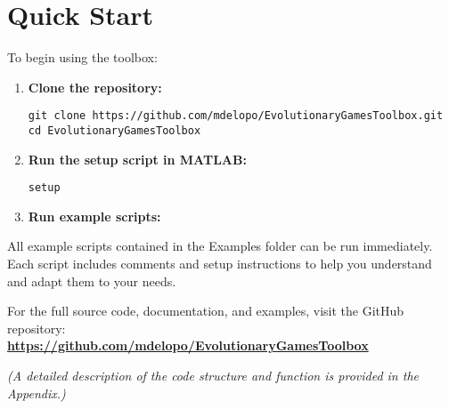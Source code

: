 \section{Quick Start}
To begin using the toolbox:
\begin{enumerate}
	\item \textbf{Clone the repository:}
	\begin{verbatim}
git clone https://github.com/mdelopo/EvolutionaryGamesToolbox.git
cd EvolutionaryGamesToolbox
	\end{verbatim}
	\item \textbf{Run the setup script in MATLAB:}
	\begin{verbatim}
setup
	\end{verbatim}
	\item \textbf{Run example scripts:}
\end{enumerate}

All example scripts contained in the Examples folder can be run immediately. Each script includes comments and setup instructions to help you understand and adapt them to your needs.

\medskip
\noindent
For the full source code, documentation, and examples, visit the GitHub repository: \\
\textbf{\url{https://github.com/mdelopo/EvolutionaryGamesToolbox}}

\medskip
\noindent
\textit{(A detailed description of the code structure and function is provided in the Appendix.)}
